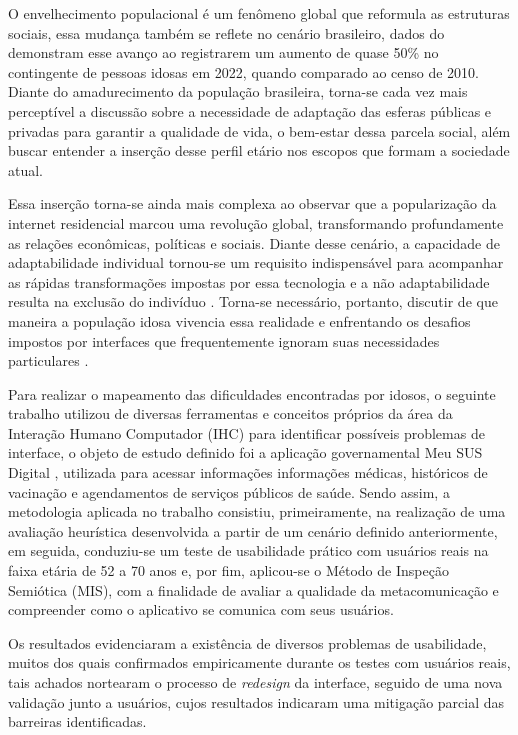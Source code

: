 \documentclass[12pt]{article}
\begin{document}
\begin{abstractp}
 O envelhecimento populacional é um fenômeno global que reformula as estruturas sociais, essa mudança também se reflete no cenário brasileiro, dados do \cite{ibge2022} demonstram esse avanço ao registrarem um aumento de quase 50\% no contingente de pessoas idosas em 2022, quando comparado ao censo de 2010. Diante do amadurecimento da população brasileira, torna-se cada vez mais perceptível a discussão sobre a necessidade de adaptação das esferas públicas e privadas para garantir a qualidade de vida, o bem-estar dessa parcela social, além buscar entender a inserção desse perfil etário nos escopos que formam a sociedade atual.

 Essa inserção torna-se ainda mais complexa  ao observar que a popularização da internet residencial marcou uma revolução global, transformando profundamente as relações econômicas, políticas e sociais. Diante desse cenário, a capacidade de adaptabilidade individual tornou-se um requisito indispensável para acompanhar as rápidas transformações impostas por essa tecnologia e a não adaptabilidade resulta na exclusão do indivíduo \cite{wiei}. Torna-se necessário, portanto, discutir de que maneira a população idosa vivencia essa realidade e enfrentando os desafios impostos por interfaces que frequentemente ignoram suas necessidades particulares \cite{alves2016tecnologias}.

 Para realizar o mapeamento das dificuldades encontradas por idosos, o seguinte trabalho utilizou de diversas ferramentas e conceitos próprios da área da Interação Humano Computador (IHC) para identificar possíveis problemas de interface, o objeto de estudo definido foi a aplicação governamental Meu SUS Digital \cite{meususdigital}, utilizada para acessar informações informações médicas, históricos de vacinação e agendamentos de serviços públicos de saúde. Sendo assim, a metodologia aplicada no trabalho consistiu, primeiramente, na realização de uma avaliação heurística desenvolvida a partir de um cenário definido anteriormente, em seguida, conduziu-se um teste de usabilidade prático com usuários reais na faixa etária de 52 a 70 anos e, por fim,  aplicou-se o Método de Inspeção Semiótica (MIS), com a finalidade de avaliar a qualidade da metacomunicação e compreender como o aplicativo se comunica com seus usuários.

Os resultados evidenciaram a existência de diversos problemas de usabilidade, muitos dos quais confirmados empiricamente durante os testes com usuários reais, tais achados nortearam o processo de \textit{redesign} da interface, seguido de uma nova validação junto a usuários, cujos resultados indicaram uma mitigação parcial das barreiras identificadas.


\end{abstractp}
\end{document}
